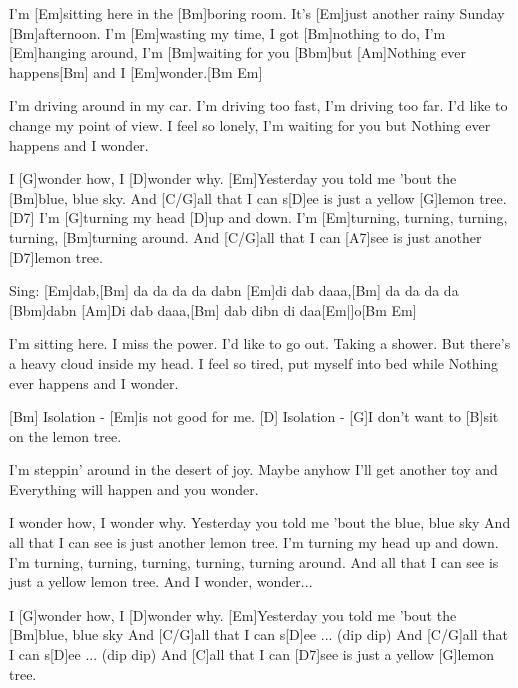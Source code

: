 

\hfill{}

\begin{guitar}

	I'm [Em]sitting here in the [Bm]boring room.
	It's [Em]just another rainy Sunday [Bm]afternoon.
	I'm [Em]wasting my time, I got [Bm]nothing to do,
	I'm [Em]hanging around, I'm [Bm]waiting for you [Bbm]but 
	[Am]Nothing ever happens[Bm] and I [Em]wonder.[Bm Em]{}
	
	I'm driving around in my car.
	I'm driving too fast, I'm driving too far.
	I'd like to change my point of view.
	I feel so lonely, I'm waiting for you but
	Nothing ever happens and I wonder.
	
	I [G]wonder how, I [D]wonder why. 
	[Em]Yesterday you told me 'bout the [Bm]blue, blue sky.
	And [C/G]all that I can s[D]ee is just a yellow [G]lemon tree.[D7]{}
	I'm [G]turning my head [D]up and down.
	I'm [Em]turning, turning, turning, turning, [Bm]turning around.
	And [C/G]all that I can [A7]see is just another [D7]lemon tree.
	
	Sing: [Em]dab,[Bm] da da da da dabn [Em]di dab daaa,[Bm] da da da da [Bbm]dabn
	 [Am]Di dab daaa,[Bm] dab dibn di daa[Em|]o[Bm Em]{}
	
	I'm sitting here. I miss the power.
	I'd like to go out. Taking a shower.
	But there's a heavy cloud inside my head.
	I feel so tired, put myself into bed while
	Nothing ever happens and I wonder.
	
	[Bm] Isolation - [Em]is not good for me.
	[D] Isolation - [G]I don't want to [B]sit on the lemon tree.
	
	I'm steppin' around in the desert of joy.
	Maybe anyhow I'll get another toy and
	Everything will happen and you wonder.
	
	I wonder how, I wonder why. 
	Yesterday you told me 'bout the blue, blue sky
	And all that I can see is just another lemon tree.
	I'm turning my head up and down.
	I'm turning, turning, turning, turning, turning around.
	And all that I can see is just a yellow lemon tree. And I wonder, wonder...
	
	I [G]wonder how, I [D]wonder why. 
	[Em]Yesterday you told me 'bout the [Bm]blue, blue sky
	And [C/G]all that I can s[D]ee ... (dip dip)
	And [C/G]all that I can s[D]ee ... (dip dip)
	And [C]all that I can [D7]see is just a yellow [G]lemon tree.
\end{guitar}
